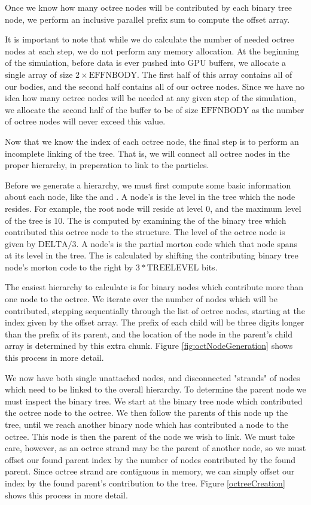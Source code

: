 \documentclass{thesis}
\begin{document}
Once we know how many octree nodes will be contributed by each binary tree node, we perform an inclusive parallel prefix sum to compute the offset array. 

It is important to note that while we do calculate the number of needed octree nodes at each step, we do not perform any memory allocation. At the beginning of the simulation, before data is ever pushed into GPU buffers, we allocate a single array of size $2\times \text{EFFNBODY}$. The first half of this array contains all of our bodies, and the second half contains all of our octree nodes. Since we have no idea how many octree nodes will be needed at any given step of the simulation, we allocate the second half of the buffer to be of size $\text{EFFNBODY}$ as the number of octree nodes will never exceed this value. 

Now that we know the index of each octree node, the final step is to perform an incomplete linking of the tree. That is, we will connect all octree nodes in the proper hierarchy, in preperation to link to the particles.

Before we generate a hierarchy, we must first compute some basic information about each node, like the  and . A node's  is the level in the tree which the node resides. For example, the root node will reside at level 0, and the maximum level of the tree is 10. The  is computed by examining the  of the binary tree which contributed this octree node to the structure. The level of the octree node is given by $\text{DELTA}/3$. A node's  is the partial morton code which that node spans at its level in the tree. The  is calculated by shifting the contributing binary tree node's morton code to the right by $3 * \text{TREELEVEL}$ bits.  

The easiest hierarchy to calculate is for binary nodes which contribute more than one node to the octree. We iterate over the number of nodes which will be contributed, stepping sequentially through the list of octree nodes, starting at the index given by the offset array. The prefix of each child will be three digits longer than the prefix of its parent, and the location of the node in the parent's child array is determined by this extra chunk. Figure \ref{fig:octNodeGeneration} shows this process in more detail.

We now have both single unattached nodes, and disconnected "strands" of nodes which need to be linked to the overall hierarchy. To determine the parent node we must inspect the binary tree. We start at the binary tree node which contributed the octree node to the octree. We then follow the parents of this node up the tree, until we reach another binary node which has contributed a node to the octree. This node is then the parent of the node we wish to link. We must take care, however, as an octree strand may be the parent of another node, so we must offset our found parent index by the number of nodes contributed by the found parent. Since octree strand are contiguous in memory, we can simply offset our index by the found parent's contribution to the tree. Figure \ref{octreeCreation} shows this process in more detail.
\end{document}
